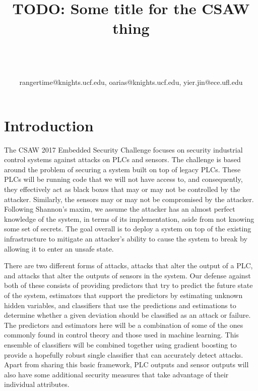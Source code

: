 \documentclass[10pt,twocolumn]{IEEEtran}
\begin{document}
\title{TODO: Some title for the CSAW thing}

\author{\\
\\
\\
{rangertime@knights.ucf.edu, oarias@knights.ucf.edu, yier.jin@ece.ufl.edu}\vspace{-0.16in}\vspace{-0.2in}}

\maketitle
\pagestyle{empty}
\thispagestyle{empty}

\begin{abstract}

\end{abstract}

\section{Introduction}
The CSAW 2017 Embedded Security Challenge focuses on security industrial control systems against attacks on PLCs and sensors.
The challenge is based around the problem of securing a system built on top of legacy PLCs.
These PLCs will be running code that we will not have access to, and consequently, they effectively act as black boxes that may or may not be controlled by the attacker.
Similarly, the sensors may or may not be compromised by the attacker.
Following Shannon's maxim, we assume the attacker has an almost perfect knowledge of the system, in terms of its implementation, aside from not knowing some set of secrets.
The goal overall is to deploy a system on top of the existing infrastructure to mitigate an attacker's ability to cause the system to break by allowing it to enter an unsafe state.

There are two different forms of attacks, attacks that alter the output of a PLC, and attacks that alter the outputs of sensors in the system.
Our defense against both of these consists of providing predictors that try to predict the future state of the system, estimators that support the predictors by estimating unknown hidden variables, and classifiers that use the predictions and estimations to determine whether a given deviation should be classified as an attack or failure.
The predictors and estimators here will be a combination of some of the ones commonly found in control theory and those used in machine learning.
This ensemble of classifiers will be combined together using gradient boosting to provide a hopefully robust single classifier that can accurately detect attacks.
Apart from sharing this basic framework, PLC outputs and sensor outputs will also have some additional security measures that take advantage of their individual attributes.
\end{document}
